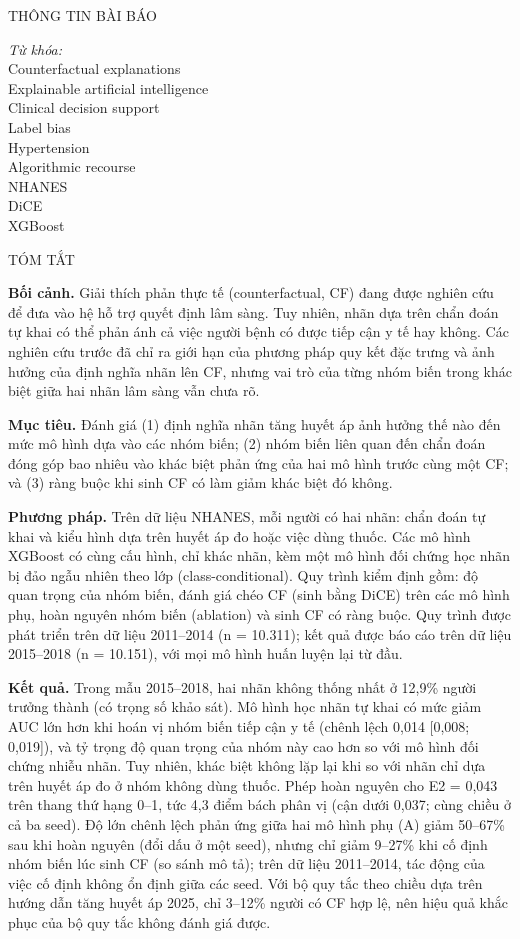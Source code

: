 \documentclass[9pt,a4paper]{extarticle}
\newcommand{\seclabel}[1]{{\fontsize{8}{10}\selectfont\addfontfeatures{LetterSpace=25}\MakeUppercase{#1}}\par\vspace{1pt}{\color{rulegray}\hrule height 0.4pt}\vspace{3pt}}
\begin{document}
{\noindent\begin{minipage}[t]{0.26\textwidth}
\seclabel{THÔNG TIN BÀI BÁO}
{\footnotesize\raggedright\textit{Từ khóa:}\\
Counterfactual explanations\\Explainable artificial intelligence\\Clinical decision support\\Label bias\\Hypertension\\Algorithmic recourse\\NHANES\\DiCE\\XGBoost\par}
\end{minipage}\hfill
\begin{minipage}[t]{0.715\textwidth}
\seclabel{TÓM TẮT}
{\small\setlength{\parskip}{2pt}\textbf{Bối cảnh.} Giải thích phản thực tế (counterfactual, CF) đang được nghiên cứu để đưa vào hệ hỗ trợ quyết định lâm sàng. Tuy nhiên, nhãn dựa trên chẩn đoán tự khai có thể phản ánh cả việc người bệnh có được tiếp cận y tế hay không. Các nghiên cứu trước đã chỉ ra giới hạn của phương pháp quy kết đặc trưng và ảnh hưởng của định nghĩa nhãn lên CF, nhưng vai trò của từng nhóm biến trong khác biệt giữa hai nhãn lâm sàng vẫn chưa rõ.

\textbf{Mục tiêu.} Đánh giá (1) định nghĩa nhãn tăng huyết áp ảnh hưởng thế nào đến mức mô hình dựa vào các nhóm biến; (2) nhóm biến liên quan đến chẩn đoán đóng góp bao nhiêu vào khác biệt phản ứng của hai mô hình trước cùng một CF; và (3) ràng buộc khi sinh CF có làm giảm khác biệt đó không.

\textbf{Phương pháp.} Trên dữ liệu NHANES, mỗi người có hai nhãn: chẩn đoán tự khai và kiểu hình dựa trên huyết áp đo hoặc việc dùng thuốc. Các mô hình XGBoost có cùng cấu hình, chỉ khác nhãn, kèm một mô hình đối chứng học nhãn bị đảo ngẫu nhiên theo lớp (class-conditional). Quy trình kiểm định gồm: độ quan trọng của nhóm biến, đánh giá chéo CF (sinh bằng DiCE) trên các mô hình phụ, hoàn nguyên nhóm biến (ablation) và sinh CF có ràng buộc. Quy trình được phát triển trên dữ liệu 2011–2014 (n = 10.311); kết quả được báo cáo trên dữ liệu 2015–2018 (n = 10.151), với mọi mô hình huấn luyện lại từ đầu.

\textbf{Kết quả.} Trong mẫu 2015–2018, hai nhãn không thống nhất ở 12,9\% người trưởng thành (có trọng số khảo sát). Mô hình học nhãn tự khai có mức giảm AUC lớn hơn khi hoán vị nhóm biến tiếp cận y tế (chênh lệch 0,014 [0,008; 0,019]), và tỷ trọng độ quan trọng của nhóm này cao hơn so với mô hình đối chứng nhiễu nhãn. Tuy nhiên, khác biệt không lặp lại khi so với nhãn chỉ dựa trên huyết áp đo ở nhóm không dùng thuốc. Phép hoàn nguyên cho E2 = 0,043 trên thang thứ hạng 0–1, tức 4,3 điểm bách phân vị (cận dưới 0,037; cùng chiều ở cả ba seed). Độ lớn chênh lệch phản ứng giữa hai mô hình phụ (A) giảm 50–67\% sau khi hoàn nguyên (đổi dấu ở một seed), nhưng chỉ giảm 9–27\% khi cố định nhóm biến lúc sinh CF (so sánh mô tả); trên dữ liệu 2011–2014, tác động của việc cố định không ổn định giữa các seed. Với bộ quy tắc theo chiều dựa trên hướng dẫn tăng huyết áp 2025, chỉ 3–12\% người có CF hợp lệ, nên hiệu quả khắc phục của bộ quy tắc không đánh giá được.

}
\end{minipage}}
\end{document}
